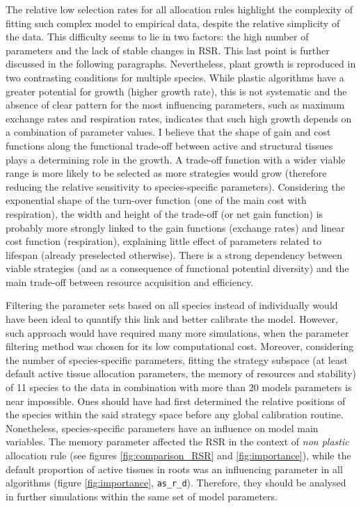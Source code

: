 The relative low selection rates for all allocation rules highlight the complexity of fitting such complex model to empirical data, despite the relative simplicity of the data. This difficulty seems to lie in two factors: the high number of parameters and the lack of stable changes in RSR. This last point is further discussed in the following paragraphs. Nevertheless, plant growth is reproduced in two contrasting conditions for multiple species. While plastic algorithms have a greater potential for growth (higher growth rate), this is not systematic and the absence of clear pattern for the most influencing parameters, such as maximum exchange rates and respiration rates, indicates that such high growth depends on a combination of parameter values. I believe that the shape of gain and cost functions along the functional trade-off between active and structural tissues plays a determining role in the growth. A trade-off function with a wider viable range is more likely to be selected as more strategies would grow (therefore reducing the relative sensitivity to species-specific parameters). Considering the exponential shape of the turn-over function (one of the main cost with respiration), the width and height of the trade-off (or net gain function) is probably more strongly linked to the gain functions (exchange rates) and linear cost function (respiration), explaining little effect of parameters related to lifespan (already preselected otherwise). There is a strong dependency between viable strategies (and as a consequence of functional potential diversity) and the main trade-off between resource acquisition and efficiency.

Filtering the parameter sets based on all species instead of individually would have been ideal to quantify this link and better calibrate the model. However, such approach would have required many more simulations, when the parameter filtering method was chosen for its low computational cost. Moreover, considering the number of species-specific parameters, fitting the strategy subspace (at least default active tissue allocation parameters, the memory of resources and stability) of 11 species to the data in combination with more than 20 models parameters is near impossible. Ones should have had first determined the relative positions of the species within the said strategy space before any global calibration routine. Nonetheless, species-specific parameters have an influence on model main variables. The memory parameter affected the RSR in the context of \textit{non plastic} allocation rule (see figures \ref{fig:comparison_RSR} and \ref{fig:importance}), while the default proportion of active tissues in roots was an influencing parameter in all algorithms (figure \ref{fig:importance}, \texttt{as\_r\_d}). Therefore, they should be analysed in further simulations within the same set of model parameters.

